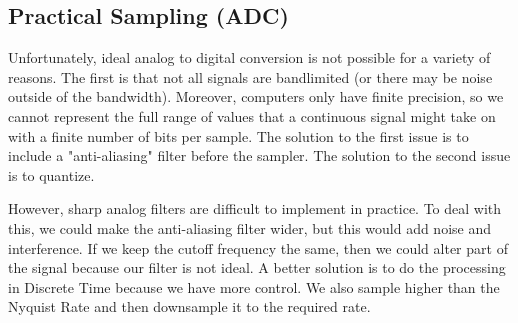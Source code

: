 \documentclass{article}
\begin{document}
\subsection{Practical Sampling (ADC)}
Unfortunately, ideal analog to digital conversion is not possible for a variety of reasons. The first is that not all signals are bandlimited (or there may be noise outside of the bandwidth).
Moreover, computers only have finite precision, so we cannot represent the full range of values that a continuous signal might take on with a finite number of bits per sample. The solution to the first issue is to include a "anti-aliasing" filter before the sampler. 
The solution to the second issue is to quantize.
\begin{figure}[H]
  \centering
\end{figure}
However, sharp analog filters are difficult to implement in practice. To deal with this,
we could make the anti-aliasing filter wider, but this would add noise and interference. If we keep the cutoff frequency the same,
then we could alter part of the signal because our filter is not ideal. A better solution is to do the processing in Discrete Time
because we have more control. We also sample higher than the Nyquist Rate and then downsample it to the required rate.
\begin{figure}[H]
  \centering
\end{figure}
\end{document}
